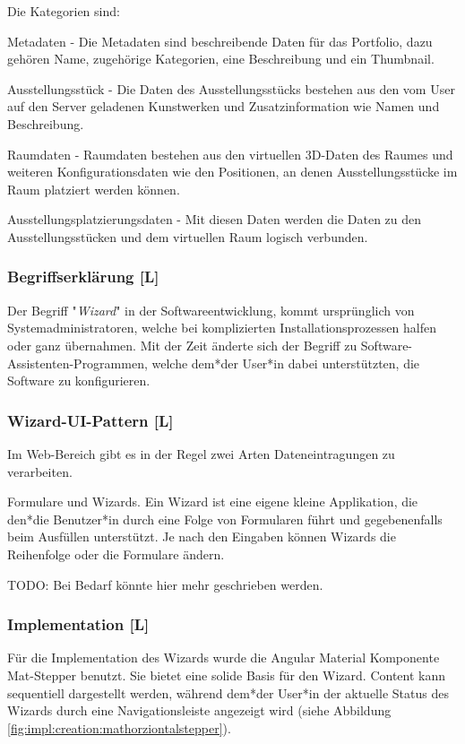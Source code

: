 Die Kategorien sind:
\begin{compactitem}
\item Metadaten - Die Metadaten sind beschreibende Daten für das Portfolio, dazu gehören Name, zugehörige Kategorien, eine Beschreibung und ein Thumbnail.
\item Ausstellungsstück - Die Daten des Ausstellungsstücks bestehen aus den vom User auf den Server geladenen Kunstwerken und Zusatzinformation wie Namen und Beschreibung.
\item Raumdaten - Raumdaten bestehen aus den virtuellen 3D-Daten des Raumes und weiteren Konfigurationsdaten wie den Positionen, an denen Ausstellungsstücke im Raum platziert werden können.
\item Ausstellungsplatzierungsdaten - Mit diesen Daten werden die Daten zu den Ausstellungsstücken und dem virtuellen Raum logisch verbunden.
\end{compactitem}

\subsubsection*{Begriffserklärung [L]}
Der Begriff "\emph{Wizard}" in der Softwareentwicklung, kommt ursprünglich von Systemadministratoren, welche bei komplizierten Installationsprozessen halfen oder ganz übernahmen. Mit der Zeit änderte sich der Begriff zu Software-Assistenten-Programmen, welche dem*der User*in dabei unterstützten, die Software zu konfigurieren. \cite[Ursprung des Begriffs Wizard]{OrigionOfWizards}

\subsubsection{Wizard-UI-Pattern [L]}
Im Web-Bereich gibt es in der Regel zwei Arten Dateneintragungen zu verarbeiten.

Formulare und Wizards. Ein Wizard ist eine eigene kleine Applikation, die den*die Benutzer*in durch eine Folge von Formularen führt und gegebenenfalls beim Ausfüllen unterstützt. Je nach den Eingaben können Wizards die Reihenfolge oder die Formulare ändern.

TODO: Bei Bedarf könnte hier mehr geschrieben werden. \cite[Wizards: Definition and Design Recommendations]{WizradsDefinitionAndRecommandation}

\subsubsection{Implementation [L]}
Für die Implementation des Wizards wurde die Angular Material Komponente Mat-Stepper benutzt. Sie bietet eine solide Basis für den Wizard. Content kann sequentiell dargestellt werden, während dem*der User*in der aktuelle Status des Wizards durch eine Navigationsleiste angezeigt wird (siehe Abbildung \ref{fig:impl:creation:mathorziontalstepper}). \cite{amStepper}

